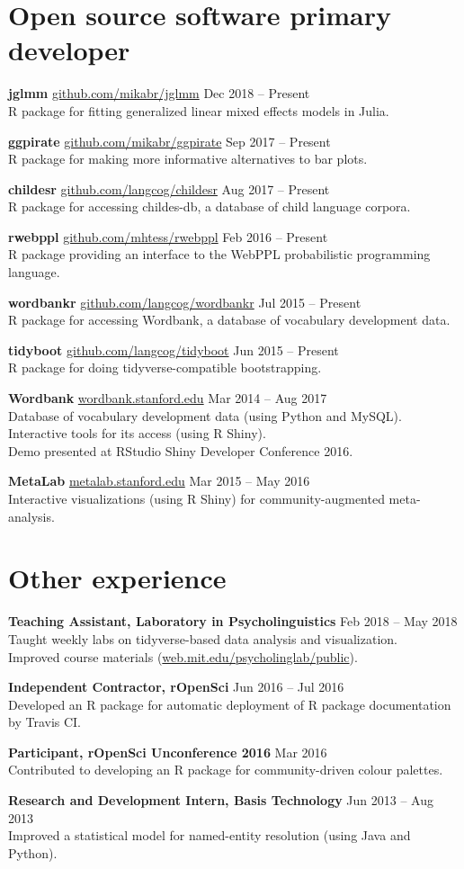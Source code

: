 \documentclass[11pt,]{article}
\newcommand{\project}[4]{
  \textbf{#1} \hspace{4pt} \small \href{http://#2}{#2} \normalsize \hfill #3\\ \hangindent=15pt #4
}
\begin{document}
\hypertarget{open-source-software}{%
\section{\texorpdfstring{\faGears \hspace{2pt} Open source software
\hfill {\small primary developer}}{ Open source software }}\label{open-source-software}}

\project{jglmm}{github.com/mikabr/jglmm}{Dec 2018 -- Present}{R package for fitting generalized linear mixed effects models in Julia.}

\project{ggpirate}{github.com/mikabr/ggpirate}{Sep 2017 -- Present}{R package for making more informative alternatives to bar plots.}

\project{childesr}{github.com/langcog/childesr}{Aug 2017 -- Present}{R package for accessing childes-db, a database of child language corpora.}

\project{rwebppl}{github.com/mhtess/rwebppl}{Feb 2016 -- Present}{R package providing an interface to the WebPPL probabilistic programming language.}

\project{wordbankr}{github.com/langcog/wordbankr}{Jul 2015 -- Present}{R package for accessing Wordbank, a database of vocabulary development data.}

\project{tidyboot}{github.com/langcog/tidyboot}{Jun 2015 -- Present}{R package for doing tidyverse-compatible bootstrapping.}

\project{Wordbank}{wordbank.stanford.edu}{Mar 2014 -- Aug 2017}{Database of vocabulary development data (using Python and MySQL).\\ Interactive tools for its access (using R Shiny).\\ Demo presented at RStudio Shiny Developer Conference 2016.}

\project{MetaLab}{metalab.stanford.edu}{Mar 2015 -- May 2016}{Interactive visualizations (using R Shiny) for community-augmented meta-analysis.}

\hypertarget{other-experience}{%
\section{\texorpdfstring{\faBriefcase \hspace{2pt} Other
experience}{ Other experience}}\label{other-experience}}

\project{Teaching Assistant, Laboratory in Psycholinguistics}{}{Feb 2018 -- May 2018}{Taught weekly labs on tidyverse-based data analysis and visualization.\\Improved course materials ({\small \href{http://web.mit.edu/psycholinglab/public}{web.mit.edu/psycholinglab/public}}).}

\project{Independent Contractor, rOpenSci}{}{Jun 2016 -- Jul 2016}{Developed an R package for automatic deployment of R package documentation by Travis CI.}

\project{Participant, rOpenSci Unconference 2016}{}{Mar 2016}{Contributed to developing an R package for community-driven colour palettes.}

\project{Research and Development Intern, Basis Technology}{}{Jun 2013 -- Aug 2013}{Improved a statistical model for named-entity resolution (using Java and Python).}
\end{document}
